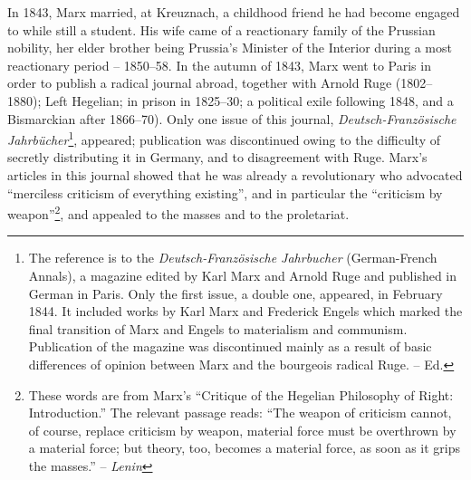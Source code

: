 \documentclass[a4paper,12pt]{book}
\newcommand{\q}[1]{``#1''}
\begin{document}
In 1843, Marx married, at Kreuznach, a childhood friend he had become engaged to while still a student. His wife came of a reactionary family of the Prussian nobility, her elder brother being Prussia’s Minister of the Interior during a most reactionary period -- 1850--58. In the autumn of 1843, Marx went to Paris in order to publish a radical journal abroad, together with Arnold Ruge (1802--1880); Left Hegelian; in prison in 1825--30; a political exile following 1848, and a Bismarckian after 1866--70). Only one issue of this journal, \emph{Deutsch-Französische Jahrbücher}\footnote{The reference is to the \textit{Deutsch-Franz\"osische Jahrbucher} (German-French Annals), a magazine edited by Karl Marx and Arnold Ruge and published in German in Paris. Only the first issue, a double one, appeared, in February 1844. It included works by Karl Marx and Frederick Engels which marked the final transition of Marx and Engels to materialism and communism. Publication of the magazine was discontinued mainly as a result of basic differences of opinion between Marx and the bourgeois radical Ruge. -- Ed.}, appeared; publication was discontinued owing to the difficulty of secretly distributing it in Germany, and to disagreement with Ruge. Marx’s articles in this journal showed that he was already a revolutionary who advocated \q{merciless criticism of everything existing}, and in particular the \q{criticism by weapon}\footnote{These words are from Marx’s “Critique of the Hegelian Philosophy of Right: Introduction.” The relevant passage reads: “The weapon of criticism cannot, of course, replace criticism by weapon, material force must be overthrown by a material force; but theory, too, becomes a material force, as soon as it grips the masses.” -- \textit{Lenin}}, and appealed to the masses and to the proletariat.
\end{document}

